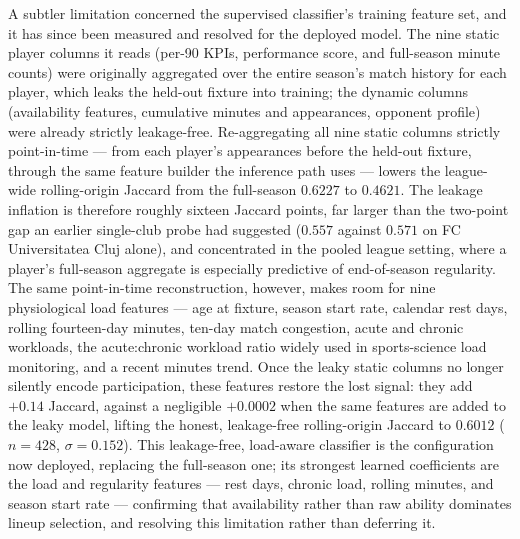 A subtler limitation concerned the supervised classifier's training feature set, and it has since been measured and resolved for the deployed model. The nine static player columns it reads (per-90 KPIs, performance score, and full-season minute counts) were originally aggregated over the entire season's match history for each player, which leaks the held-out fixture into training; the dynamic columns (availability features, cumulative minutes and appearances, opponent profile) were already strictly leakage-free. Re-aggregating all nine static columns strictly point-in-time --- from each player's appearances before the held-out fixture, through the same feature builder the inference path uses --- lowers the league-wide rolling-origin Jaccard from the full-season $0.6227$ to $0.4621$. The leakage inflation is therefore roughly sixteen Jaccard points, far larger than the two-point gap an earlier single-club probe had suggested ($0.557$ against $0.571$ on FC Universitatea Cluj alone), and concentrated in the pooled league setting, where a player's full-season aggregate is especially predictive of end-of-season regularity. The same point-in-time reconstruction, however, makes room for nine physiological load features --- age at fixture, season start rate, calendar rest days, rolling fourteen-day minutes, ten-day match congestion, acute and chronic workloads, the acute:chronic workload ratio widely used in sports-science load monitoring, and a recent minutes trend. Once the leaky static columns no longer silently encode participation, these features restore the lost signal: they add $+0.14$ Jaccard, against a negligible $+0.0002$ when the same features are added to the leaky model, lifting the honest, leakage-free rolling-origin Jaccard to $\mathbf{0.6012}$ ($n = 428$, $\sigma = 0.152$). This leakage-free, load-aware classifier is the configuration now deployed, replacing the full-season one; its strongest learned coefficients are the load and regularity features --- rest days, chronic load, rolling minutes, and season start rate --- confirming that availability rather than raw ability dominates lineup selection, and resolving this limitation rather than deferring it.


